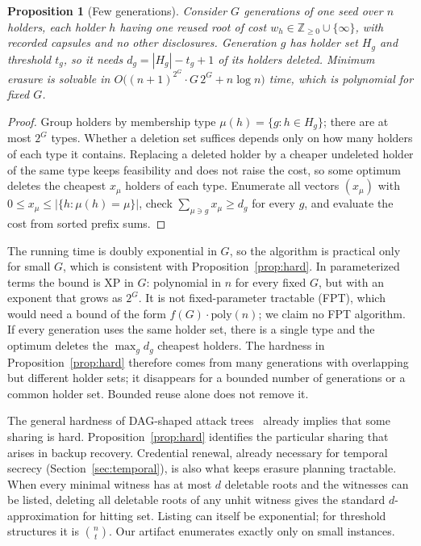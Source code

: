 \documentclass[pdflatex,sn-mathphys-num]{sn-jnl}%
\theoremstyle{plain}
\newtheorem{proposition}[theorem]{Proposition}
\theoremstyle{definition}
\begin{document}
\begin{proposition}[Few generations]\label{prop:fewgen}
Consider $G$ generations of one seed over $n$ holders, each holder $h$ having one reused root of cost $w_h\in\mathbb{Z}_{\ge0}\cup\{\infty\}$, with recorded capsules and no other disclosures. Generation $g$ has holder set $H_g$ and threshold $t_g$, so it needs $d_g=|H_g|-t_g+1$ of its holders deleted. Minimum erasure is solvable in $O\big((n+1)^{2^G}\cdot G\,2^G+n\log n\big)$ time, which is polynomial for fixed $G$.
\end{proposition}
\begin{proof}
Group holders by membership type $\mu(h)=\{g:h\in H_g\}$; there are at most $2^G$ types. Whether a deletion set suffices depends only on how many holders of each type it contains. Replacing a deleted holder by a cheaper undeleted holder of the same type keeps feasibility and does not raise the cost, so some optimum deletes the cheapest $x_\mu$ holders of each type. Enumerate all vectors $(x_\mu)$ with $0\le x_\mu\le|\{h:\mu(h)=\mu\}|$, check $\sum_{\mu\ni g}x_\mu\ge d_g$ for every $g$, and evaluate the cost from sorted prefix sums.
\end{proof}

The running time is doubly exponential in $G$, so the algorithm is practical only for small $G$, which is consistent with Proposition~\ref{prop:hard}. In parameterized terms the bound is XP in $G$: polynomial in $n$ for every fixed $G$, but with an exponent that grows as $2^G$. It is not fixed-parameter tractable (FPT), which would need a bound of the form $f(G)\cdot\mathrm{poly}(n)$; we claim no FPT algorithm. If every generation uses the same holder set, there is a single type and the optimum deletes the $\max_gd_g$ cheapest holders. The hardness in Proposition~\ref{prop:hard} therefore comes from many generations with overlapping but different holder sets; it disappears for a bounded number of generations or a common holder set. Bounded reuse alone does not remove it.

The general hardness of DAG-shaped attack trees~\cite{lopuhaa2022} already implies that some sharing is hard. Proposition~\ref{prop:hard} identifies the particular sharing that arises in backup recovery. Credential renewal, already necessary for temporal secrecy (Section~\ref{sec:temporal}), is also what keeps erasure planning tractable. When every minimal witness has at most $d$ deletable roots and the witnesses can be listed, deleting all deletable roots of any unhit witness gives the standard $d$-approximation for hitting set. Listing can itself be exponential; for threshold structures it is $\binom{n}{t}$. Our artifact enumerates exactly only on small instances.
\end{document}
